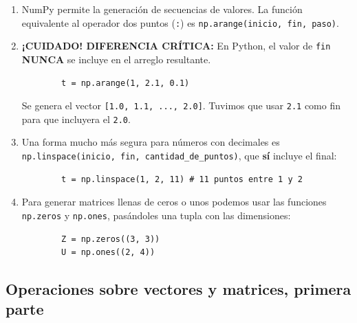 \documentclass[11pt,a4paper,openany]{book}
\begin{document}
\begin{enumerate}
	\item NumPy permite la generación de secuencias de valores. La función equivalente al operador dos puntos (\texttt{:}) es \texttt{np.arange(inicio, fin, paso)}.
	\item \textbf{¡CUIDADO! DIFERENCIA CRÍTICA:} En Python, el valor de \texttt{fin} \textbf{NUNCA} se incluye en el arreglo resultante.
	\begin{verbatim}
		t = np.arange(1, 2.1, 0.1)
	\end{verbatim}
	Se genera el vector \texttt{[1.0, 1.1, ..., 2.0]}. Tuvimos que usar \texttt{2.1} como fin para que incluyera el \texttt{2.0}.
	
	\item Una forma mucho más segura para números con decimales es \texttt{np.linspace(inicio, fin, cantidad\_de\_puntos)}, que \textbf{sí} incluye el final:
	\begin{verbatim}
		t = np.linspace(1, 2, 11) # 11 puntos entre 1 y 2
	\end{verbatim}
	
	\item Para generar matrices llenas de ceros o unos podemos usar las funciones \texttt{np.zeros} y \texttt{np.ones}, pasándoles una tupla con las dimensiones:
	\begin{verbatim}
		Z = np.zeros((3, 3))
		U = np.ones((2, 4))
	\end{verbatim}
\end{enumerate}

\subsection{Operaciones sobre vectores y matrices, primera parte}
\end{document}
